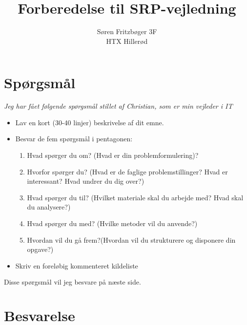 \documentclass[12pt]{article}
\numberwithin{equation}{section}
\begin{document}
\title{Forberedelse til SRP-vejledning}
\author{Søren Fritzbøger 3F\\
HTX Hillerød}
\maketitle

\section{Spørgsmål}
\emph{Jeg har fået følgende spørgsmål stillet af Christian, som er min vejleder i IT}

\begin{itemize}
\item Lav en kort (30-40 linjer) beskrivelse af dit emne.
\item Besvar de fem spørgsmål i pentagonen:
\begin{enumerate}
\item Hvad spørger du om? (Hvad er din problemformulering)?
\item Hvorfor spørger du? (Hvad er de faglige problemstillinger? Hvad er interessant? Hvad undrer du dig over?)
\item Hvad spørger du til? (Hvilket materiale skal du arbejde med? Hvad skal du
analysere?)
\item Hvad spørger du med? (Hvilke metoder vil du anvende?)
\item Hvordan vil du gå frem?(Hvordan vil du strukturere og disponere din opgave?)
\end{enumerate}
\item Skriv en foreløbig kommenteret kildeliste
\end{itemize}

Disse spørgsmål vil jeg besvare på næste side.

\newpage
\section{Besvarelse}
\end{document}

